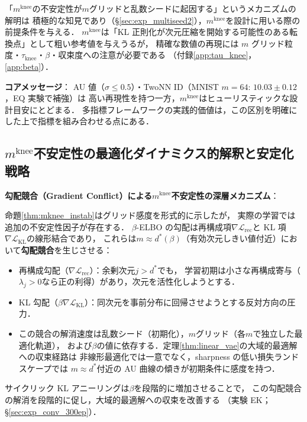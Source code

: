 \documentclass[11pt,a4paper]{jsarticle}
\newcommand{\mknee}{m^{\mathrm{knee}}}
\begin{document}
「$\mknee$の不安定性が$m$グリッドと乱数シードに起因する」というメカニズムの解明は
積極的な知見であり（§\ref{sec:exp_multiseed2}），$\mknee$を設計に用いる際の前提条件を与える．
$\mknee$は「KL 正則化が次元圧縮を開始する可能性のある転換点」として粗い参考値を与えうるが，
精確な数値の再現には $m$ グリッド粒度・$\tau_\mathrm{knee}$・$\beta$・収束度への注意が必要である
（付録\ref{app:tau_knee}，\ref{app:beta}）．

\textbf{コアメッセージ}：
AU 値（$\sigma \leq 0.5$）・TwoNN ID（MNIST $m=64$: $10.03 \pm 0.12$，EQ 実験で補強）は
高い再現性を持つ一方，$\mknee$はヒューリスティックな設計目安にとどまる．
多指標フレームワークの実践的価値は，この区別を明確にした上で指標を組み合わせる点にある．

\subsection{$\mknee$不安定性の最適化ダイナミクス的解釈と安定化戦略}\label{sec:disc_mknee_improve}

\textbf{勾配競合（Gradient Conflict）による$\mknee$不安定性の深層メカニズム}：

命題\ref{thm:mknee_instab}はグリッド感度を形式的に示したが，
実際の学習では追加の不安定性因子が存在する．
$\beta$-ELBO の勾配は再構成項$\nabla\mathcal{L}_\mathrm{rec}$と
KL 項$\nabla\mathcal{L}_\mathrm{KL}$の線形結合であり，
これらは$m \approx d^*(\beta)$（有効次元しきい値付近）において\textbf{勾配競合}を生じさせる：

\begin{itemize}
  \item 再構成勾配（$\nabla\mathcal{L}_\mathrm{rec}$）：余剰次元$j > d^*$でも，
        学習初期は小さな再構成寄与（$\lambda_j > 0$なら正の利得）があり，次元を活性化しようとする．
  \item KL 勾配（$\beta\nabla\mathcal{L}_\mathrm{KL}$）：同次元を事前分布に回帰させようとする反対方向の圧力．
  \item この競合の解消速度は乱数シード（初期化），$m$グリッド（各$m$で独立した最適化軌道），
        および$\beta$の値に依存する．定理\ref{thm:linear_vae}の大域的最適解への収束経路は
        非線形最適化では一意でなく，sharpness の低い損失ランドスケープでは
        $m \approx d^*$付近の AU 曲線の傾きが初期条件に感度を持つ．
\end{itemize}

サイクリック KL アニーリング\cite{fu2019cyclical}は$\beta$を段階的に増加させることで，
この勾配競合の解消を段階的に促し，大域的最適解への収束を改善する
（実験 EK；§\ref{sec:exp_conv_300ep}）．
\end{document}

